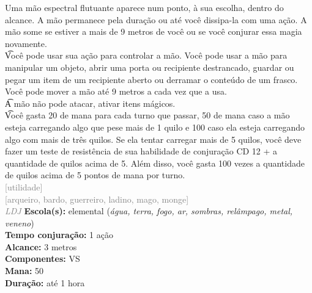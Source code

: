 \documentclass{RPG_Adventure}[2021/10/20]
\begin{document}
{\normalsize Uma mão espectral flutuante aparece num ponto, à sua escolha, dentro do alcance. A mão permanece pela duração ou até você dissipa-la com uma ação. A mão some se estiver a mais de 9 metros de você ou se você conjurar essa magia novamente.\\\t Você pode usar sua ação para controlar a mão. Você pode usar a mão para manipular um objeto, abrir uma porta ou recipiente destrancado, guardar ou pegar um item de um recipiente aberto ou derramar o conteúdo de um frasco. Você pode mover a mão até 9 metros a cada vez que a usa.\\\t A mão não pode atacar, ativar itens mágicos.\\\t Você gasta 20 de mana para cada turno que passar, 50 de mana caso a mão esteja carregando algo que pese mais de 1 quilo e 100 caso ela esteja carregando algo com mais de três quilos. Se ela tentar carregar mais de 5 quilos, você deve fazer um teste de resistência de sua habilidade de conjuração CD 12 + a quantidade de quilos acima de 5. Além disso, você gasta 100 vezes a quantidade de quilos acima de 5 pontos de mana por turno.\\}
{\scriptsize \textcolor{gray}{[utilidade]\\}}
{\scriptsize \textcolor{gray}{[arqueiro, bardo, guerreiro, ladino, mago, monge]\\}}
{\tiny \textcolor{gray}{\textit{LDJ}}}\jump{}
{\small \t \textbf{Escola(s):} elemental (\textit{água, terra, fogo, ar, sombras, relâmpago, metal, veneno})\\\t \textbf{Tempo conjuração:} 1 ação\\\t \textbf{Alcance:} 3 metros\\\t \textbf{Componentes:} VS\\\t \textbf{Mana:} 50\\\t \textbf{Duração:} até 1 hora\\}
\end{document}

